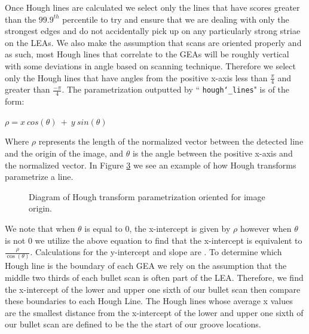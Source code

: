 \documentclass[12pt]{article}
\theoremstyle{nonumberplain}
\begin{document}
Once Hough lines are calculated we select only the lines that have scores greater than the $99.9^{th}$ percentile to try and ensure that we are dealing with only the strongest edges and do not accidentally pick up on any particularly strong striae on the LEAs. We also make the assumption that scans are oriented properly and as such, most Hough lines that correlate to the GEAs will be roughly vertical with some deviations in angle based on scanning technique. Therefore we select only the Hough lines that have angles from the positive x-axis less than $\frac{\pi}{4}$ and greater than $\frac{-\pi}{4}$. The parametrization outputted by `` \texttt{hough\char`_lines}" is of the form:

\begin{center}
$\rho = x \ cos(\theta) \ + \ y \ sin(\theta)$
\end{center}

Where $\rho$ represents the length of the normalized vector between the detected line and the origin of the image, and $\theta$ is the angle between the positive x-axis and the normalized vector. In Figure \ref{fig: parametrization} we see an example of how Hough transforms parametrize a line.

\begin{figure}[!ht]
  \begin{subfigure}{.5\textwidth}
    \centering
  \label{fig: tikz1}
  \end{subfigure}
  \begin{subfigure}{.5\textwidth}
    \centering
    \label{fig: tikz2}
  \end{subfigure}
  \caption{Diagram of Hough transform parametrization oriented for image origin.}
  \label{fig: parametrization}
\end{figure}

We note that when $\theta$ is equal to 0, the x-intercept is given by $\rho$ however when $\theta$ is not 0 we utilize the above equation to find that the x-intercept is equivalent to $\frac{\rho}{\cos(\theta)}$. Calculations for the y-intercept and slope are . To determine which Hough line is the boundary of each GEA we rely on the assumption that the middle two thirds of each bullet scan is often part of the LEA. Therefore, we find the x-intercept of the lower and upper one sixth of our bullet scan then compare these boundaries to each Hough Line. The Hough lines whose average x values are the smallest distance from the x-intercept of the lower and upper one sixth of our bullet scan are defined to be the the start of our groove locations. 
\end{document}

